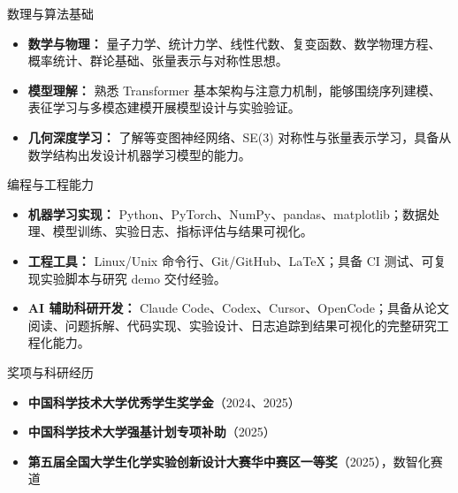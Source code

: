 \documentclass[]{mcdowellcv}
\begin{document}
\begin{cvsection}{数理与算法基础}
    \begin{cvsubsection}{}{}{}
        \begin{itemize}
            \item \textbf{数学与物理：} 量子力学、统计力学、线性代数、复变函数、数学物理方程、概率统计、群论基础、张量表示与对称性思想。
            \item \textbf{模型理解：} 熟悉 Transformer 基本架构与注意力机制，能够围绕序列建模、表征学习与多模态建模开展模型设计与实验验证。
            \item \textbf{几何深度学习：} 了解等变图神经网络、SE(3) 对称性与张量表示学习，具备从数学结构出发设计机器学习模型的能力。
        \end{itemize}
    \end{cvsubsection}
\end{cvsection}

\begin{cvsection}{编程与工程能力}
    \begin{cvsubsection}{}{}{}
        \begin{itemize}
            \item \textbf{机器学习实现：} Python、PyTorch、NumPy、pandas、matplotlib；数据处理、模型训练、实验日志、指标评估与结果可视化。
            \item \textbf{工程工具：} Linux/Unix 命令行、Git/GitHub、LaTeX；具备 CI 测试、可复现实验脚本与研究 demo 交付经验。
            \item \textbf{AI 辅助科研开发：} Claude Code、Codex、Cursor、OpenCode；具备从论文阅读、问题拆解、代码实现、实验设计、日志追踪到结果可视化的完整研究工程化能力。
        \end{itemize}
    \end{cvsubsection}
\end{cvsection}

\begin{cvsection}{奖项与科研经历}
    \begin{cvsubsection}{}{}{}
        \begin{itemize}
            \item \textbf{中国科学技术大学优秀学生奖学金}（2024、2025）
            \item \textbf{中国科学技术大学强基计划专项补助}（2025）
            \item \textbf{第五届全国大学生化学实验创新设计大赛华中赛区一等奖}（2025），数智化赛道
        \end{itemize}
    \end{cvsubsection}
\end{cvsection}
\end{document}
